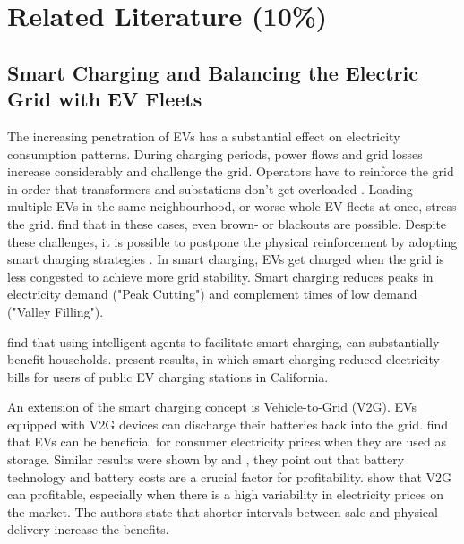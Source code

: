 \documentclass[12pt, article]{article}
\begin{document}
\section{Related Literature (10\%)}
\label{sec:org634d02c}
\subsection{Smart Charging and Balancing the Electric Grid with EV Fleets}
\label{sec:orgf963a9f}
The increasing penetration of EVs has a substantial effect on electricity consumption
patterns. During charging periods, power flows and grid losses increase
considerably and challenge the grid. Operators have to reinforce the grid in
order that transformers and substations don't get overloaded
\parencite{lopes11_integ_elect_vehic_elect_power_system}. Loading multiple EVs in the
same neighbourhood, or worse whole EV fleets at once, stress the grid.
\textcite{kim12_carbit} find that in these cases, even brown- or blackouts are
possible. Despite these challenges, it is possible to postpone the physical
reinforcement by adopting smart charging strategies \parencite{kim12_carbit}. In
smart charging, EVs get charged when the grid is less congested to achieve more
grid stability. Smart charging reduces peaks in electricity demand ("Peak Cutting") and
complement times of low demand ("Valley Filling").


\textcite{valogianni14_effec_manag_elect_vehic_storag} find that using intelligent
agents to facilitate smart charging, can substantially benefit households.
\textcite{kara15_estim_benef_elect_vehic_smart} present results, in which smart
charging reduced electricity bills for users of public EV charging stations in
California.

An extension of the smart charging concept is Vehicle-to-Grid (V2G). EVs
equipped with V2G devices can discharge their batteries back into the grid.
\textcite{schill11_elect_vehic_imper_elect_market} find that EVs can be beneficial
for consumer electricity prices when they are used as storage. Similar results were shown by
\textcite{reichert10_consid_highl_effic_bidir_batter} and
\textcite{peterson10_econom_using_plug_in_hybrid}, they point out that battery
technology and battery costs are a crucial factor for profitability.
\textcite{tomic07_using_fleet_elect_drive_vehic_grid_suppor} show that V2G can
profitable, especially when there is a high variability in electricity prices on
the market. The authors state that shorter intervals between sale and physical
delivery increase the benefits.
\end{document}
